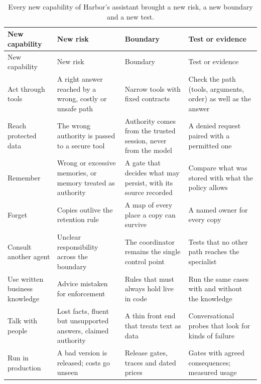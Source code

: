\begingroup
\small
\begin{xltabular}{\textwidth}{@{}>{\raggedright\arraybackslash}p{2.5cm}>{\raggedright\arraybackslash}X>{\raggedright\arraybackslash}X>{\raggedright\arraybackslash}X@{}}
\caption{Every new capability of Harbor's assistant brought a new risk, a new boundary and a new test.}\label{tab:journey}\\
\toprule
{} New capability & New risk & Boundary & Test or evidence \\
\midrule
\endfirsthead
\toprule
{} New capability & New risk & Boundary & Test or evidence \\
\midrule
\endhead
Act through tools & A right answer reached by a wrong, costly or unsafe path & Narrow tools with fixed contracts & Check the path (tools, arguments, order) as well as the answer \\
Reach protected data & The wrong authority is passed to a secure tool & Authority comes from the trusted session, never from the model & A denied request paired with a permitted one \\
Remember & Wrong or excessive memories, or memory treated as authority & A gate that decides what may persist, with its source recorded & Compare what was stored with what the policy allows \\
Forget & Copies outlive the retention rule & A map of every place a copy can survive & A named owner for every copy \\
Consult another agent & Unclear responsibility across the boundary & The coordinator remains the single control point & Tests that no other path reaches the specialist \\
Use written business knowledge & Advice mistaken for enforcement & Rules that must always hold live in code & Run the same cases with and without the knowledge \\
Talk with people & Lost facts, fluent but unsupported answers, claimed authority & A thin front end that treats text as data & Conversational probes that look for kinds of failure \\
Run in production & A bad version is released; costs go unseen & Release gates, traces and dated prices & Gates with agreed consequences; measured usage \\
\bottomrule
\end{xltabular}
\endgroup

